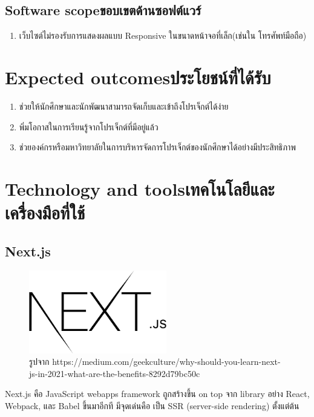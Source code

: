 \subsection{\ifenglish Software scope\else ขอบเขตด้านซอฟต์แวร์\fi}
\begin{enumerate}
  \item เว็บไซต์ไม่รองรับการแสดงผลแบบ Responsive ในขนาดหน้าจอที่เล็ก(เช่นใน โทรศัพท์มือถือ)
\end{enumerate}
\section{\ifenglish Expected outcomes\else ประโยชน์ที่ได้รับ\fi}
\begin{enumerate}
    \item ช่วยให้นักศึกษาและนักพัฒนาสามารถจัดเก็บและเข้าถึงโปรเจ็กต์ได้ง่าย
    \item พิ่มโอกาสในการเรียนรู้จากโปรเจ็กต์ที่มีอยู่แล้ว
    \item ช่วยองค์กรหรือมหาวิทยาลัยในการบริหารจัดการโปรเจ็กต์ของนักศึกษาได้อย่างมีประสิทธิภาพ
\end{enumerate}

\section{\ifenglish Technology and tools\else เทคโนโลยีและเครื่องมือที่ใช้\fi}
\subsection{Next.js}
\begin{figure}[H] %
    \centering
    \includegraphics[width=60mm, keepaspectratio ]{pictures/nextjs.png}
    \caption[Poem]{รูปจาก https://medium.com/geekculture/why-should-you-learn-next-js-in-2021-what-are-the-benefits-8292d79bc50c}
    \label{fig:nextjs}
\end{figure}
\hspace{1.27cm}Next.js\cite{Nextjs} คือ JavaScript webapps framework ถูกสร้างขึ้น on top จาก library อย่าง React, Webpack, และ Babel ขึ้นมาอีกที มีจุดเด่นคือ เป็น SSR (server-side rendering) ตั้งแต่ต้น
